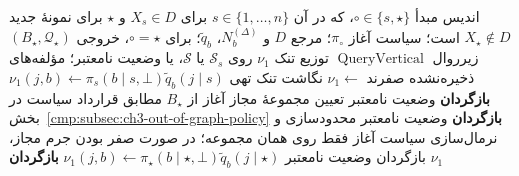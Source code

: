 \begin{algorithm}[!htbp]
\caption{زیرروال $\operatorname{FirstState}$: توزیع نخستین گام}
\label{cmp:alg:ch3-first-state}
\begin{algorithmic}[1]
\REQUIRE اندیس مبدأ $\circ\in\{s,\star\}$،
که در آن $s\in\{1,\ldots,n\}$ برای $X_s\in D$
و $\star$ برای نمونهٔ جدید $X_\star\notin D$ است؛
سیاست آغاز $\pi_\circ$؛
مرجع $D$ و $N_b^{(\Delta)}$، $\widetilde q_b$؛
برای $\circ=\star$، خروجی $(B_\star,\mathcal Q_\star)$
زیرروال $\operatorname{QueryVertical}$
\ENSURE توزیع تنک $\nu_1$ روی
$\mathcal S_s$ یا $\mathcal S$، یا وضعیت نامعتبر؛
مؤلفه‌های ذخیره‌نشده صفرند
\STATE $\nu_1\gets$ نگاشت تنک تهی
            \STATE $\nu_1(j,b)\gets
            \pi_s(b\mid s,\bot)\widetilde q_b(j\mid s)$
        \ENDFOR
    \ENDFOR
\ELSE
        \STATE \textbf{بازگردان} وضعیت نامعتبر
    \ENDIF
    \STATE تعیین مجموعهٔ مجاز آغاز از $B_\star$
    مطابق قرارداد سیاست در بخش~\ref{cmp:subsec:ch3-out-of-graph-policy}
        \STATE \textbf{بازگردان} وضعیت نامعتبر
    \ENDIF
    \STATE محدودسازی و نرمال‌سازی سیاست آغاز
    فقط روی همان مجموعه؛ در صورت صفر بودن
    جرم مجاز، بازگردان وضعیت نامعتبر
            \STATE $\nu_1(j,b)\gets
            \pi_\star(b\mid\star,\bot)
            \widetilde q_b(j\mid\star)$
        \ENDFOR
    \ENDFOR
\ENDIF
\STATE \textbf{بازگردان} $\nu_1$
\end{algorithmic}
\end{algorithm}

